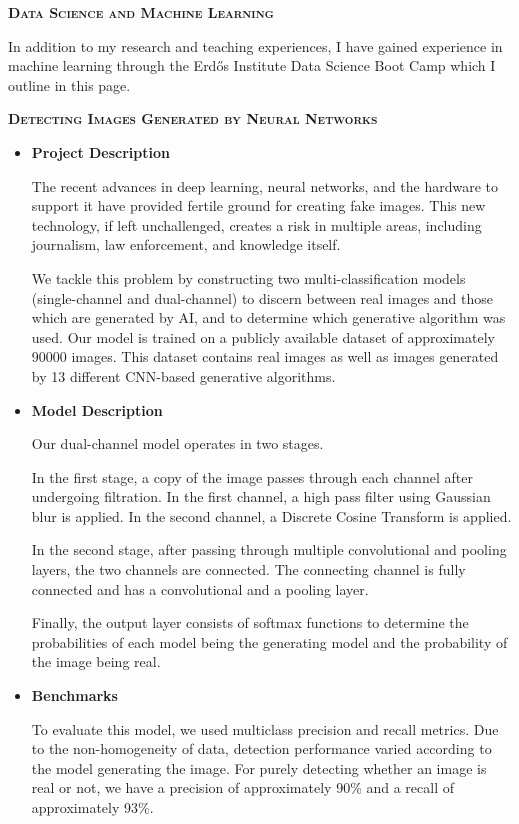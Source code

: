 \documentclass[11pt]{amsart}
\theoremstyle{remark}
\begin{document}
{\large{\textbf{\textsc{Data Science and Machine Learning}}}

In addition to my research and teaching experiences, I have gained experience in machine learning through the Erdős Institute Data Science Boot Camp which I outline in this page.

\normalsize{\textbf{\textsc{Detecting Images Generated by Neural Networks}}}

\begin{itemize}
	
	\item {\bf Project Description}
	
	The recent advances in deep learning, neural networks, and the hardware to support it have provided fertile ground for creating fake images. This new technology, if left unchallenged, creates a risk in multiple areas, including journalism, law enforcement, and knowledge itself.
	
	We tackle this problem by constructing two multi-classification models (single-channel and dual-channel) to discern between real images and those which are generated by AI, and to determine which generative algorithm was used. Our model is trained on a publicly available dataset of approximately 90000 images. This dataset contains real images as well as images generated by 13 different CNN-based generative algorithms.
	
	\vspace{0.5in}
	
	\item {\bf Model Description}
	
	Our dual-channel model operates in two stages. 
	
	In the first stage, a copy of the image passes through each channel after undergoing filtration. In the first channel, a high pass filter using Gaussian blur is applied. In the second channel, a Discrete Cosine Transform is applied. 
	
	In the second stage, after passing through multiple convolutional and pooling layers, the two channels are connected. The connecting channel is fully connected and has a convolutional and a pooling layer.
	
	Finally, the output layer consists of softmax functions to determine the probabilities of each model being the generating model and the probability of the image being real.
	
	\item {\bf Benchmarks}
	
	To evaluate this model, we used multiclass precision and recall metrics. Due to the non-homogeneity of data, detection performance varied according to the model generating the image. For purely detecting whether an image is real or not, we have a precision of approximately 90\% and a recall of approximately 93\%.
	

\end{itemize}}
\end{document}
